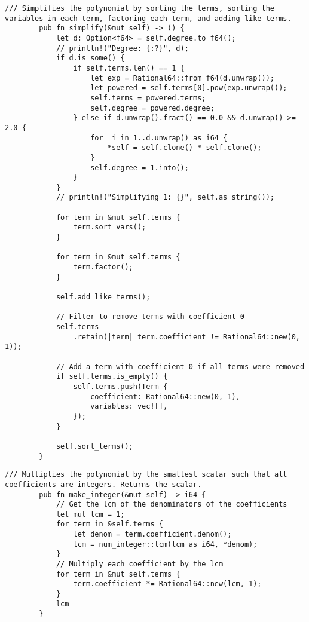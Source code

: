     \begin{lstlisting}[caption={The implementation of the \texttt{simplify()} method for the \texttt{Polynomial} struct}, label={lst:polynomial-simplify}]
        /// Simplifies the polynomial by sorting the terms, sorting the variables in each term, factoring each term, and adding like terms.
        pub fn simplify(&mut self) -> () {
            let d: Option<f64> = self.degree.to_f64();
            // println!("Degree: {:?}", d);
            if d.is_some() {
                if self.terms.len() == 1 {
                    let exp = Rational64::from_f64(d.unwrap());
                    let powered = self.terms[0].pow(exp.unwrap());
                    self.terms = powered.terms;
                    self.degree = powered.degree;
                } else if d.unwrap().fract() == 0.0 && d.unwrap() >= 2.0 {
                    for _i in 1..d.unwrap() as i64 {
                        *self = self.clone() * self.clone();
                    }
                    self.degree = 1.into();
                }
            }
            // println!("Simplifying 1: {}", self.as_string());

            for term in &mut self.terms {
                term.sort_vars();
            }

            for term in &mut self.terms {
                term.factor();
            }

            self.add_like_terms();

            // Filter to remove terms with coefficient 0
            self.terms
                .retain(|term| term.coefficient != Rational64::new(0, 1));

            // Add a term with coefficient 0 if all terms were removed
            if self.terms.is_empty() {
                self.terms.push(Term {
                    coefficient: Rational64::new(0, 1),
                    variables: vec![],
                });
            }

            self.sort_terms();
        }
    \end{lstlisting}

    \begin{lstlisting}[caption={The implementation of the \texttt{make\_integer()} method for the \texttt{Polynomial} struct}, label={lst:polynomial-make-integer}]
        /// Multiplies the polynomial by the smallest scalar such that all coefficients are integers. Returns the scalar.
        pub fn make_integer(&mut self) -> i64 {
            // Get the lcm of the denominators of the coefficients
            let mut lcm = 1;
            for term in &self.terms {
                let denom = term.coefficient.denom();
                lcm = num_integer::lcm(lcm as i64, *denom);
            }
            // Multiply each coefficient by the lcm
            for term in &mut self.terms {
                term.coefficient *= Rational64::new(lcm, 1);
            }
            lcm
        }
    \end{lstlisting}

